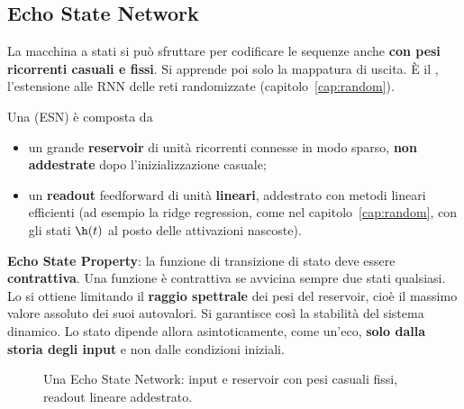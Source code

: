 \subsection{Echo State Network}
\label{sec:esn}

La macchina a stati si può sfruttare per codificare le sequenze anche \textbf{con pesi ricorrenti casuali e fissi}.
Si apprende poi solo la mappatura di uscita. È il , l'estensione alle RNN delle reti
randomizzate (capitolo~\ref{cap:random}).

\begin{definizione}
Una  (ESN) è composta da
\begin{itemize}
  \item un grande \textbf{reservoir} di unità ricorrenti connesse in modo sparso, \textbf{non addestrate} dopo
        l'inizializzazione casuale;
  \item un \textbf{readout} feedforward di unità \textbf{lineari}, addestrato con metodi lineari efficienti (ad esempio
        la ridge regression, come nel capitolo~\ref{cap:random}, con gli stati $\h(t)$ al posto delle attivazioni
        nascoste).
\end{itemize}
\textbf{Echo State Property}: la funzione di transizione di stato deve essere \textbf{contrattiva}. Una funzione è
contrattiva se avvicina sempre due stati qualsiasi. Lo si ottiene limitando il \textbf{raggio spettrale} dei pesi del
reservoir, cioè il massimo valore assoluto dei suoi autovalori. Si garantisce così la stabilità del sistema
dinamico. Lo stato dipende allora asintoticamente, come un'eco, \textbf{solo dalla storia degli input} e non dalle
condizioni iniziali.
\end{definizione}

\begin{figure}[ht]
\centering
{}
\caption{Una Echo State Network: input e reservoir con pesi casuali fissi, readout lineare addestrato.}
\label{fig:esn}
\end{figure}

